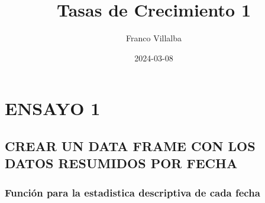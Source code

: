 \documentclass[
]{article}
\title{Tasas de Crecimiento 1}
\author{Franco Villalba}
\date{2024-03-08}
\begin{document}
\maketitle

{
\setcounter{tocdepth}{4}
\tableofcontents
}
\hypertarget{ensayo-1}{%
\section{ENSAYO 1}\label{ensayo-1}}

\hypertarget{crear-un-data-frame-con-los-datos-resumidos-por-fecha}{%
\subsection{CREAR UN DATA FRAME CON LOS DATOS RESUMIDOS POR
FECHA}\label{crear-un-data-frame-con-los-datos-resumidos-por-fecha}}

\hypertarget{funciuxf3n-para-la-estadistica-descriptiva-de-cada-fecha}{%
\subsubsection{Función para la estadistica descriptiva de cada
fecha}\label{funciuxf3n-para-la-estadistica-descriptiva-de-cada-fecha}}
\end{document}
